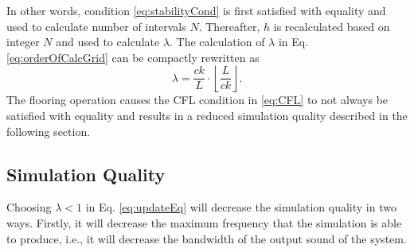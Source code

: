 In other words, condition \eqref{eq:stabilityCond} is first satisfied with equality and used to calculate number of intervals $N$. Thereafter, $h$ is recalculated based on integer $N$ and used to calculate $\lambda$. The calculation of $\lambda$ in Eq. \eqref{eq:orderOfCalcGrid} can be compactly rewritten as
\begin{equation}\label{eq:compactLambda}
    \lambda = \frac{ck}{L}\cdot\left\lfloor\frac{L}{ck}\right\rfloor.
\end{equation}
The flooring operation causes the CFL condition in \eqref{eq:CFL} to not always be satisfied with equality and results in a reduced simulation quality described in the following section.

\subsection{Simulation Quality}\label{sec:quality}
Choosing $\lambda < 1$ in Eq. \eqref{eq:updateEq} will decrease the simulation quality in two ways. Firstly, it will decrease the maximum frequency that the simulation is able to produce, i.e., it will decrease the bandwidth of the output sound of the system. 

